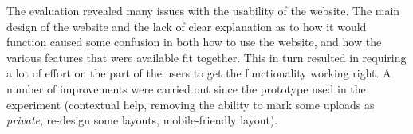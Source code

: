 \documentclass[sigplan,10pt,review]{acmart}\settopmatter{printfolios=true}
\begin{document}
The evaluation revealed many issues with the usability of the
website. The main design of the website and the lack of clear
explanation as to how it would function caused some confusion in both
how to use the website, and how the various features that were
available fit together. This in turn resulted in requiring a lot of
effort on the part of the users to get the functionality working
right. A number of improvements were carried out since the
prototype used in the experiment (contextual help, removing the
ability to mark some uploads as \emph{private}, re-design some
layouts, mobile-friendly layout).


\end{document}
